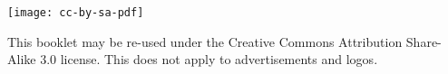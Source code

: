 \vspace{1em}
\noindent \begin{minipage}[htbp]{0.2\textwidth}
\noindent\texttt{[image: cc-by-sa-pdf]}
\end{minipage}
\hfill
\begin{minipage}[hbtp]{0.74\textwidth}\RaggedRight
  {\small
    This booklet may be re-used under the Creative Commons Attribution Share-Alike 3.0 license.
    This does not apply to advertisements and logos.
  }
\end{minipage}
\newpage

\pagestyle{page-public-transport}
\label{public-transport-map}
\null
\newpage
\pagestyle{page-citymap-left}
\label{maps}
\null
\newpage
\pagestyle{page-citymap-right}
\null
\newpage
\pagestyle{page-campus}
\null
